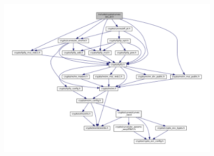 \begin{figure}[h!]\centering
	\includegraphics[scale=.675, angle=-90]{dep-graph/prj_pt.pdf}
\end{figure}

\newpage
\ \\
